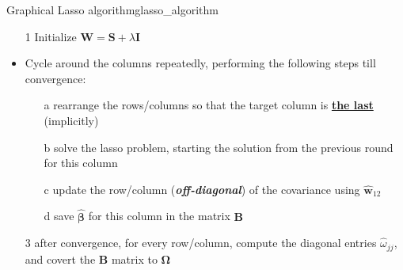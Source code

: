 \documentclass[twoside]{article}
\begin{document}
\begin{algorithm}{Graphical Lasso algorithm}{glasso_algorithm}
    \begin{itemize}
        \item[1] Initialize $\mathbf{W}= \mathbf{S} + \lambda\mathbf{I}$ 
        \item Cycle around the columns repeatedly, performing the following steps till convergence: 
        \begin{itemize}
            \item[a] rearrange the rows/columns so that the target column is \textbf{\underline{the last}} (implicitly)
            \item[b] solve the lasso problem, starting the solution from the previous round for this column
            \item[c] update the row/column (\textbf{\textit{off-diagonal}}) of the covariance using $\hat{\mathbf{w}}_{12}$
            \item[d] save $\hat{\boldsymbol{\beta}}$ for this column in the matrix $\mathbf{B}$
        \end{itemize}
        \item[3] after convergence, for every row/column, compute the diagonal entries $\hat{\omega}_{jj}$, and covert the $\mathbf{B}$ matrix to $\boldsymbol{\Omega}$
    \end{itemize}
\end{algorithm}
\end{document}
